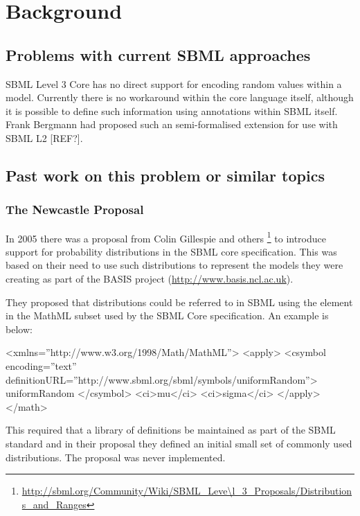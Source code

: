 \documentclass[draftspec]{sbmlpkgspec}
\newcommand{\mathml}{MathML\xspace}
\begin{document}
\section{Background}

\subsection{Problems with current SBML approaches}

SBML Level 3 Core has no direct support for encoding random values
within a model. Currently there is no workaround within the core
language itself, although it is possible to define such information
using annotations within SBML itself. Frank Bergmann had proposed such
an semi-formalised extension for use with SBML L2 [REF?].

\subsection{Past work on this problem or similar topics}

\subsubsection{The Newcastle Proposal}
\label{sec:newcastle proposal}

In 2005 there was a proposal from Colin Gillespie and others
\footnote{\url{http://sbml.org/Community/Wiki/SBML\_Leve\l_3\_Proposals/Distributions\_and\_Ranges}}
to introduce support for probability distributions in the SBML core specification. This
was based on their need to use such distributions to represent the
models they were creating as part of the BASIS project
(\url{http://www.basis.ncl.ac.uk}).

They proposed that distributions could be referred to in SBML using
the  element in the \mathml subset used by
the SBML Core specification. An example is below:

\begin{example}
<xmlns=''http://www.w3.org/1998/Math/MathML''>
  <apply>
    <csymbol encoding=''text''
        definitionURL=''http://www.sbml.org/sbml/symbols/uniformRandom''>
      uniformRandom
    </csymbol>
    <ci>mu</ci>
    <ci>sigma</ci>
  </apply>
</math>
\end{example}

This required that a library of definitions be maintained as part of
the SBML standard and in their proposal they defined an initial small
set of commonly used distributions. The proposal was never
implemented.
\end{document}
